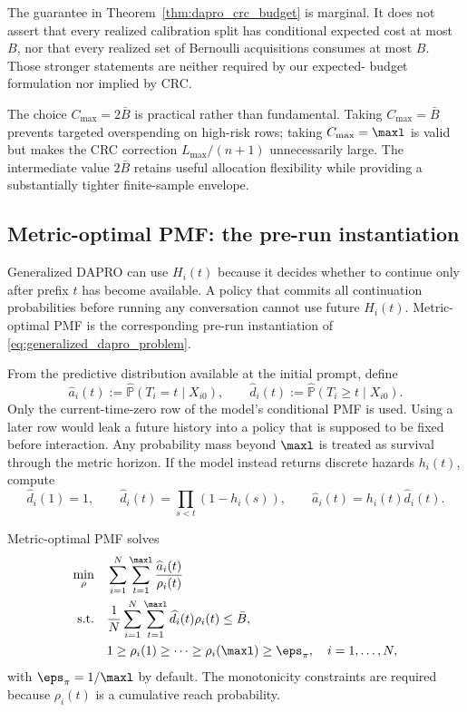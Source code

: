The guarantee in Theorem~\ref{thm:dapro_crc_budget} is marginal.  It does not
assert that every realized calibration split has conditional expected cost at
most $B$, nor that every realized set of Bernoulli acquisitions consumes at
most $B$.  Those stronger statements are neither required by our expected-
budget formulation nor implied by CRC.

The choice $C_{\max}=2\bar B$ is practical rather than fundamental.  Taking
$C_{\max}=\bar B$ prevents targeted overspending on high-risk rows; taking
$C_{\max}=\maxl$ is valid but makes the CRC correction
$L_{\max}/(n+1)$ unnecessarily large.  The intermediate value $2\bar B$
retains useful allocation flexibility while providing a substantially tighter
finite-sample envelope.

\subsection{Metric-optimal PMF: the pre-run instantiation}
\label{sec:metric_optimal_pmf}

Generalized DAPRO can use $H_i(t)$ because it decides whether to continue only
after prefix $t$ has become available.  A policy that commits all
continuation probabilities before running any conversation cannot use future
$H_i(t)$.  Metric-optimal PMF is the corresponding pre-run instantiation of
\eqref{eq:generalized_dapro_problem}.

From the predictive distribution available at the initial prompt, define
\begin{equation}
    \widehat a_i(t)
    :=\widehat{\mathbb P}(T_i=t\mid X_{i0}),
    \qquad
    \widehat d_i(t)
    :=\widehat{\mathbb P}(T_i\geq t\mid X_{i0}).
    \label{eq:pmf_coefficients}
\end{equation}
Only the current-time-zero row of the model's conditional PMF is used.  Using
a later row would leak a future history into a policy that is supposed to be
fixed before interaction.  Any probability mass beyond $\maxl$ is treated as
survival through the metric horizon.  If the model instead returns discrete
hazards $h_i(t)$, compute
\begin{equation}
    \widehat d_i(1)=1,
    \qquad
    \widehat d_i(t)=\prod_{s<t}(1-h_i(s)),
    \qquad
    \widehat a_i(t)=h_i(t)\widehat d_i(t).
\end{equation}

Metric-optimal PMF solves
\begin{equation}
\label{eq:metric_pmf_problem}
\begin{aligned}
    \min_{\rho}\quad
    &\sum_{i=1}^{N}\sum_{t=1}^{\maxl}
      \frac{\widehat a_i(t)}{\rho_i(t)}\\
    \text{s.t.}\quad
    &\frac{1}{N}\sum_{i=1}^{N}\sum_{t=1}^{\maxl}
      \widehat d_i(t)\rho_i(t)\leq\bar B,\\
    &1\geq\rho_i(1)\geq\cdots\geq\rho_i(\maxl)
      \geq\eps_\pi,\quad i=1,\ldots,N,
\end{aligned}
\end{equation}
with $\eps_\pi=1/\maxl$ by default.  The monotonicity constraints are required
because $\rho_i(t)$ is a cumulative reach probability.

